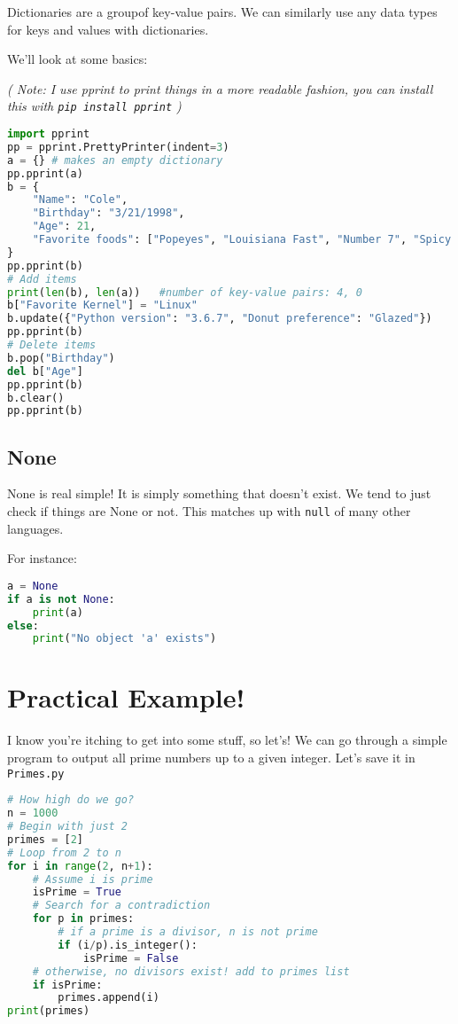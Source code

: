 \documentclass[12pt, twoside, reqno]{book}
\begin{document}
Dictionaries are a groupof key-value pairs. We can similarly use any data types for keys and values with dictionaries.

We'll look at some basics:

\textit{( Note: I use pprint to print things in a more readable fashion, you can install this with \texttt{pip install pprint} )}
\begin{lstlisting}[language=Python]
import pprint
pp = pprint.PrettyPrinter(indent=3)
a = {} # makes an empty dictionary
pp.pprint(a)
b = {
    "Name": "Cole",
    "Birthday": "3/21/1998",
    "Age": 21,
    "Favorite foods": ["Popeyes", "Louisiana Fast", "Number 7", "Spicy Chicken"]
}
pp.pprint(b)
# Add items
print(len(b), len(a))   #number of key-value pairs: 4, 0
b["Favorite Kernel"] = "Linux"
b.update({"Python version": "3.6.7", "Donut preference": "Glazed"})
pp.pprint(b)
# Delete items
b.pop("Birthday")
del b["Age"]
pp.pprint(b)
b.clear()
pp.pprint(b)
\end{lstlisting}

\subsection{None}

None is real simple! It is simply something that doesn't exist. We tend to just check if things are None or not. This matches up with \texttt{null} of many other languages.

For instance:
\begin{lstlisting}[language=Python]
a = None
if a is not None:
    print(a)
else:
    print("No object 'a' exists")
\end{lstlisting}

\section{Practical Example!}

I know you're itching to get into some stuff, so let's! We can go through a simple program to output all prime numbers up to a given integer. Let's save it in \texttt{Primes.py}
\begin{lstlisting}[language=Python]
# How high do we go?
n = 1000
# Begin with just 2
primes = [2]
# Loop from 2 to n
for i in range(2, n+1):
    # Assume i is prime
    isPrime = True
    # Search for a contradiction
    for p in primes:
        # if a prime is a divisor, n is not prime
        if (i/p).is_integer():
            isPrime = False
    # otherwise, no divisors exist! add to primes list
    if isPrime:
        primes.append(i)
print(primes)
\end{lstlisting}
\end{document}
